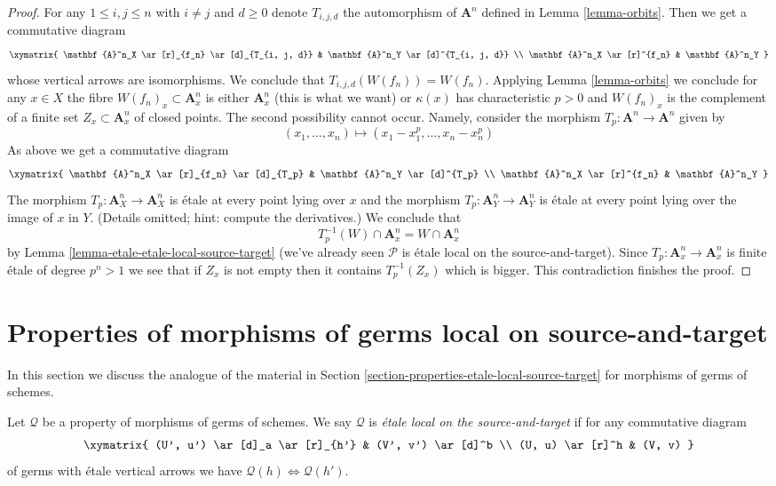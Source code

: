 \begin{proof}
\medskip\noindent
For any $1 \leq i, j \leq n$ with $i \not = j$ and $d \geq 0$
denote $T_{i, j, d}$ the automorphism of $\mathbf{A}^n$ defined
in Lemma \ref{lemma-orbits}. Then we get a commutative diagram
$$
\xymatrix{
\mathbf{A}^n_X \ar[r]_{f_n} \ar[d]_{T_{i, j, d}} &
\mathbf{A}^n_Y \ar[d]^{T_{i, j, d}} \\
\mathbf{A}^n_X \ar[r]^{f_n} & \mathbf{A}^n_Y
}
$$
whose vertical arrows are isomorphisms. We conclude that
$T_{i, j, d}(W(f_n)) = W(f_n)$. Applying Lemma \ref{lemma-orbits}
we conclude for any $x \in X$ the fibre $W(f_n)_x \subset \mathbf{A}^n_x$ is
either $\mathbf{A}^n_x$ (this is what we want) or $\kappa(x)$
has characteristic $p > 0$ and $W(f_n)_x$
is the complement of a finite set $Z_x \subset \mathbf{A}^n_x$
of closed points. The second possibility cannot occur. Namely,
consider the morphism $T_p : \mathbf{A}^n \to \mathbf{A}^n$ given by
$$
(x_1, \ldots, x_n) \mapsto (x_1 - x_1^p, \ldots, x_n - x_n^p)
$$
As above we get a commutative diagram
$$
\xymatrix{
\mathbf{A}^n_X \ar[r]_{f_n} \ar[d]_{T_p} &
\mathbf{A}^n_Y \ar[d]^{T_p} \\
\mathbf{A}^n_X \ar[r]^{f_n} & \mathbf{A}^n_Y
}
$$
The morphism $T_p : \mathbf{A}^n_X \to \mathbf{A}^n_X$
is \'etale at every point lying over $x$
and the morphism $T_p : \mathbf{A}^n_Y \to \mathbf{A}^n_Y$
is \'etale at every point lying over the image of $x$ in $Y$.
(Details omitted; hint: compute the derivatives.)
We conclude that
$$
T_p^{-1}(W) \cap \mathbf{A}^n_x = W \cap \mathbf{A}^n_x
$$
by Lemma \ref{lemma-etale-etale-local-source-target}
(we've already seen $\mathcal{P}$ is
\'etale local on the source-and-target).
Since $T_p : \mathbf{A}^n_x \to \mathbf{A}^n_x$ is finite \'etale
of degree $p^n > 1$ we see that if $Z_x$ is not empty then it contains
$T_p^{-1}(Z_x)$ which is bigger. This contradiction finishes
the proof.
\end{proof}





\section{Properties of morphisms of germs local on source-and-target}
\label{section-local-source-target-at-point}

\noindent
In this section we discuss the analogue of the material in
Section \ref{section-properties-etale-local-source-target}
for morphisms of germs of schemes.

\begin{definition}
\label{definition-local-source-target-at-point}
Let $\mathcal{Q}$ be a property of morphisms of germs of schemes.
We say $\mathcal{Q}$ is  {\it \'etale local on the source-and-target}
if for any commutative diagram
$$
\xymatrix{
(U', u') \ar[d]_a \ar[r]_{h'} & (V', v') \ar[d]^b \\
(U, u) \ar[r]^h & (V, v)
}
$$
of germs with \'etale vertical arrows we have
$\mathcal{Q}(h) \Leftrightarrow \mathcal{Q}(h')$.
\end{definition}

